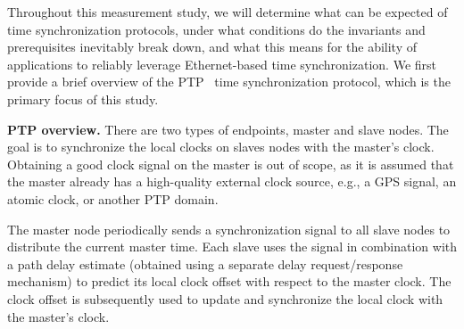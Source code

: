 Throughout this measurement study, we will determine what can be expected of time
synchronization protocols,
under what conditions do the invariants and prerequisites inevitably break down,
and what this means for the ability of applications to reliably leverage
Ethernet-based time synchronization.
We first provide a brief overview of the
PTP~\cite{ptp-spec} time synchronization protocol,
which is the primary focus of this study.


\textbf{PTP overview.}
There are two types of endpoints, master and slave nodes.
The goal is to synchronize the local clocks on slaves nodes with the master's
clock.
Obtaining a good clock signal on the master is out of scope, %
as it is assumed that the master already has a high-quality external clock source,
e.g., a GPS signal, an atomic clock, or another PTP domain.

The master node periodically sends a synchronization signal to all slave nodes
to distribute the current master time.
Each slave uses the signal in combination with a path delay estimate
(obtained using a separate delay request/response mechanism)
to predict its local clock offset with respect to the master clock.
The clock offset is subsequently used to update and synchronize the local clock
with the master's clock.


